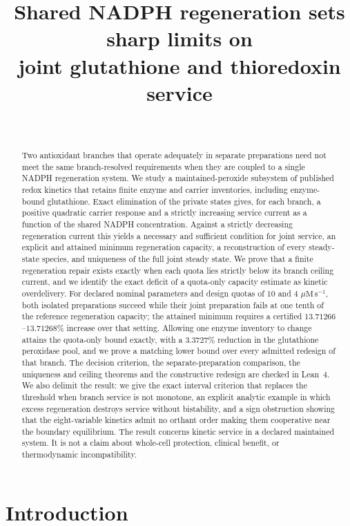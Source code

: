 \documentclass[11pt,a4paper]{article}
\title{\bfseries Shared NADPH regeneration sets sharp limits on\\ joint glutathione and thioredoxin service}
\author{\PaperAuthor\\ \PaperAffiliation}
\date{\PaperDate}
\theoremstyle{plain}
\theoremstyle{definition}
\theoremstyle{remark}
\newcommand{\fluxunit}{\ensuremath{\mu\mathrm{M}\,\mathrm{s}^{-1}}}
\begin{document}
\maketitle

\begin{abstract}
Two antioxidant branches that operate adequately in separate preparations need not
meet the same branch-resolved requirements when they are coupled to a single NADPH
regeneration system. We study a maintained-peroxide subsystem of published redox
kinetics that retains finite enzyme and carrier inventories, including
enzyme-bound glutathione. Exact elimination of the private states gives, for each
branch, a positive quadratic carrier response and a strictly increasing service
current as a function of the shared NADPH concentration. Against a strictly
decreasing regeneration current this yields a necessary and sufficient condition
for joint service, an explicit and attained minimum regeneration capacity, a
reconstruction of every steady-state species, and uniqueness of the full joint
steady state. We prove that a finite regeneration repair exists exactly when each
quota lies strictly below its branch ceiling current, and we identify the exact
deficit of a quota-only capacity estimate as kinetic overdelivery. For declared
nominal parameters and design quotas of $10$ and $4$ \fluxunit, both isolated
preparations succeed while their joint preparation fails at one tenth of the
reference regeneration capacity; the attained minimum requires a certified
$13.71266$--$13.71268\%$ increase over that setting. Allowing one enzyme
inventory to change attains the quota-only bound exactly, with a $3.3727\%$
reduction in the glutathione peroxidase pool, and we prove a matching lower bound
over every admitted redesign of that branch. The decision criterion, the
separate-preparation comparison, the uniqueness and ceiling theorems and the
constructive redesign are checked in Lean~4. We also delimit the result: we give
the exact interval criterion that replaces the threshold when branch service is
not monotone, an explicit analytic example in which excess regeneration destroys
service without bistability, and a sign obstruction showing that the eight-variable
kinetics admit no orthant order making them cooperative near the boundary
equilibrium. The result concerns kinetic service in a declared maintained system.
It is not a claim about whole-cell protection, clinical benefit, or thermodynamic
incompatibility.
\end{abstract}

\section{Introduction}\label{sec:intro}
\end{document}
